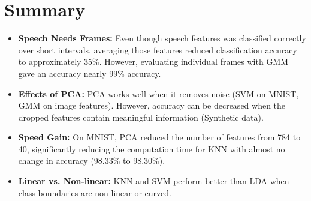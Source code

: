 \documentclass[11pt,a4paper]{article}
\begin{document}
\section{Summary}
\begin{itemize}
  \item \textbf{Speech Needs Frames:} Even though speech features was classified correctly over short intervals, averaging those features reduced classification accuracy to approximately 35\%. However, evaluating individual frames with GMM gave an accuracy nearly 99\% accuracy.
  \item \textbf{Effects of PCA:} PCA works well when it removes noise (SVM on MNIST, GMM on image features). However, accuracy can be decreased when the dropped features contain meaningful information (Synthetic data).
  \item \textbf{Speed Gain:} On MNIST, PCA reduced the number of features from 784 to 40, significantly reducing the computation time for KNN with almost no change in accuracy (98.33\% to 98.30\%).
  \item \textbf{Linear vs. Non-linear:} KNN and SVM perform better than LDA when class boundaries are non-linear or curved.
\end{itemize}
\end{document}
